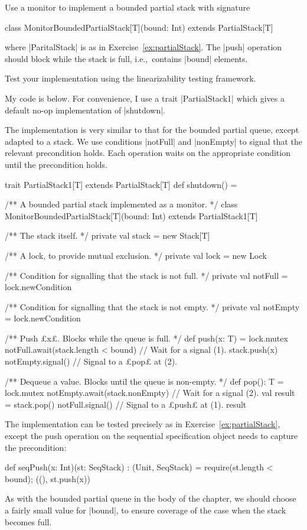 \begin{questionS}
\label{ex:boundedPartialStack}
Use a monitor to implement a bounded partial stack with signature
\begin{scala}
class MonitorBoundedPartialStack[T](bound: Int) extends PartialStack[T]
\end{scala}
where |ParitalStack| is as in Exercise~\ref{ex:partialStack}.  The |push|
operation should block while the stack is full, i.e.,~contains |bound|
elements.

Test your implementation using the linearizability testing framework.
\end{questionS}


\begin{answerS}
My code is below.  For convenience, I use a trait |PartialStack1| which gives
a default no-op implementation of |shutdown|.

The implementation is very similar to that for the bounded partial queue,
except adapted to a stack.  We use conditions |notFull| and |nonEmpty| to
signal that the relevant precondition holds.  Each operation waits on the
appropriate condition until the precondition holds.
%
\begin{scala}
trait PartialStack1[T] extends PartialStack[T]{
  def shutdown() = {}
}

/** A bounded partial stack implemented as a monitor. */
class MonitorBoundedPartialStack[T](bound: Int) extends PartialStack1[T]{
  /** The stack itself. */
  private val stack = new Stack[T]

  /** A lock, to provide mutual exclusion. */
  private val lock = new Lock

  /** Condition for signalling that the stack is not full. */
  private val notFull = lock.newCondition

  /** Condition for signalling that the stack is not empty. */
  private val notEmpty = lock.newCondition

  /** Push £x£.  Blocks while the queue is full. */
  def push(x: T) = lock.mutex{
    notFull.await(stack.length < bound) // Wait for a signal (1).
    stack.push(x)
    notEmpty.signal() // Signal to a £pop£ at (2).
  }

  /** Dequeue a value.  Blocks until the queue is non-empty. */
  def pop(): T = lock.mutex{
    notEmpty.await(stack.nonEmpty) // Wait for a signal (2).
    val result = stack.pop()
    notFull.signal() // Signal to a £push£ at (1).
    result
  }
} 
\end{scala}

The implementation can be tested precisely as in
Exercise~\ref{ex:partialStack}, except the push operation on the sequential
specification object needs to capture the precondition:
%
\begin{scala}
  def seqPush(x: Int)(st: SeqStack) : (Unit, SeqStack) = {
    require(st.length < bound); ((), st.push(x))
  }
\end{scala}
%
As with the bounded partial queue in the body of the chapter, we should choose
a fairly small value for |bound|, to ensure coverage of the case when the
stack becomes full.
\end{answerS}
